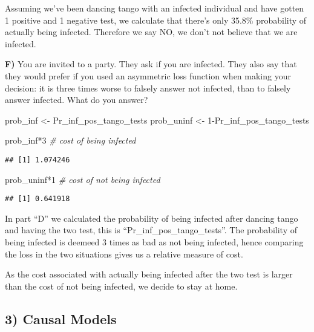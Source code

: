 \documentclass[
]{article}
\newenvironment{Shaded}{\begin{snugshade}}{\end{snugshade}}
\newcommand{\CommentTok}[1]{\textcolor[rgb]{0.56,0.35,0.01}{\textit{#1}}}
\newcommand{\DecValTok}[1]{\textcolor[rgb]{0.00,0.00,0.81}{#1}}
\newcommand{\NormalTok}[1]{#1}
\newcommand{\OtherTok}[1]{\textcolor[rgb]{0.56,0.35,0.01}{#1}}
\newcommand{\SpecialCharTok}[1]{\textcolor[rgb]{0.00,0.00,0.00}{#1}}
\begin{document}
Assuming we've been dancing tango with an infected individual and have
gotten 1 positive and 1 negative test, we calculate that there's only
35.8\% probability of actually being infected. Therefore we say NO, we
don't not believe that we are infected.

\textbf{F)} You are invited to a party. They ask if you are infected.
They also say that they would prefer if you used an asymmetric loss
function when making your decision: it is three times worse to falsely
answer not infected, than to falsely answer infected. What do you
answer?

\begin{Shaded}
\begin{Highlighting}[]
\NormalTok{prob\_inf }\OtherTok{\textless{}{-}}\NormalTok{ Pr\_inf\_pos\_tango\_tests}
\NormalTok{prob\_uninf }\OtherTok{\textless{}{-}} \DecValTok{1}\SpecialCharTok{{-}}\NormalTok{Pr\_inf\_pos\_tango\_tests}

\NormalTok{prob\_inf}\SpecialCharTok{*}\DecValTok{3} \CommentTok{\# cost of being infected}
\end{Highlighting}
\end{Shaded}

\begin{verbatim}
## [1] 1.074246
\end{verbatim}

\begin{Shaded}
\begin{Highlighting}[]
\NormalTok{prob\_uninf}\SpecialCharTok{*}\DecValTok{1} \CommentTok{\# cost of not being infected}
\end{Highlighting}
\end{Shaded}

\begin{verbatim}
## [1] 0.641918
\end{verbatim}

In part ``D'' we calculated the probability of being infected after
dancing tango and having the two test, this is
``Pr\_inf\_pos\_tango\_tests''. The probability of being infected is
deemeed 3 times as bad as not being infected, hence comparing the loss
in the two situations gives us a relative measure of cost.

As the cost associated with actually being infected after the two test
is larger than the cost of not being infected, we decide to stay at
home.

\hypertarget{causal-models}{%
\subsection{3) Causal Models}\label{causal-models}}
\end{document}
